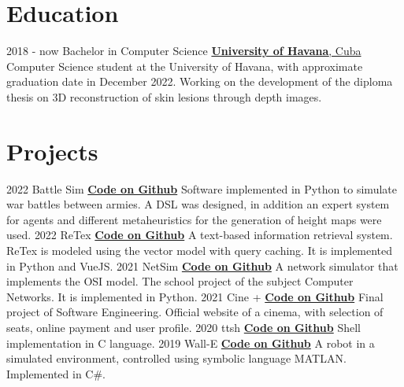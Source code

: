 \documentclass[a4paper]{mctemplate} %
\begin{document}

\begin{main}

\section{Education}

\begin{experiencelist} 
	\experienceitem
    	{2018 - now }
        {Bachelor in Computer Science}
        {\href{https://www.uh.cu/}{\textbf{University of Havana}, Cuba}}
        {Computer Science student at the University of Havana, with approximate graduation date in December 2022. Working on the development of the diploma thesis on 3D reconstruction of skin lesions through depth images.}
\end{experiencelist}


\section{Projects}

\begin{experiencelist}
    \experienceitem
    	{2022}
        {Battle Sim}
        {\href{https://github.com/ArielTriana/battle-sim}{\textbf{Code on Github}}}
        {Software implemented in Python to simulate war battles between armies. A DSL was designed, in addition an expert system for agents and different metaheuristics for the generation of height maps were used.}
    \experienceitem
    	{2022}
        {ReTex}
        {\href{https://github.com/ArielTriana/retex}{\textbf{Code on Github}}}
        {A text-based information retrieval system. ReTex is modeled using the vector model with query caching. It is implemented in Python and VueJS.}
    \experienceitem
    	{2021}
        {NetSim}
        {\href{https://github.com/ArielTriana/net-sim}{\textbf{Code on Github}}}
        {A network simulator that implements the OSI model. The school project of the subject Computer Networks. It is implemented in Python.}
    \experienceitem
    	{2021}
        {Cine +}
        {\href{https://github.com/ArielTriana/Cine-}{\textbf{Code on Github}}}
        {Final project of Software Engineering. Official website of a cinema, with selection of seats, online payment and user profile.}
    \experienceitem
    	{2020}
        {ttsh}
        {\href{https://github.com/ArielTriana/ttsh}{\textbf{Code on Github}}}
        {Shell implementation in C language.}
    \experienceitem
    	{2019}
        {Wall-E}
        {\href{https://github.com/ArielTriana/Wall-E}{\textbf{Code on Github}}}
        {A robot in a simulated environment, controlled using symbolic language MATLAN. Implemented in C\#.}
\end{experiencelist}


\end{main}
\end{document}
